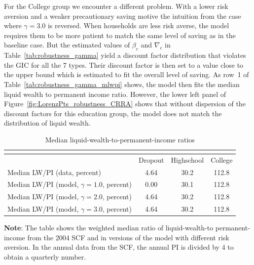 \documentclass[\econtexRoot/HAFiscal]{subfiles}
\begin{document}
For the College group we encounter a different problem. With a lower risk aversion and a weaker precautionary saving motive the intuition from the case where $\gamma=3.0$ is reversed. When households are less risk averse, the model requires them to be more patient to match the same level of saving as in the baseline case. But the estimated values of $\beta_c$ and $\nabla_c$ in Table~\ref{tab:robustness_gamma} yield a discount factor distribution that violates the GIC for all the 7 types. Their discount factor is then set to a value close to the upper bound which is estimated to fit the overall level of saving. As row~1 of Table~\ref{tab:robustness_gamma_mlwpi} shows, the model then fits the median liquid wealth to permanent income ratio. However, the lower left panel of Figure~\ref{fig:LorenzPts_robustness_CRRA} shows that without dispersion of the discount factors for this education group, the model does not match the distribution of liquid wealth.

 
\begin{table}[th]
  \begin{center}
    \begin{tabular}{lccc}
      \multicolumn{4}{l}{} \\ \midrule
      & Dropout & Highschool & College \\ \midrule
      Median LW/PI (data, percent) & 4.64 & 30.2 & 112.8 \\ 
      Median LW/PI (model, $\gamma = 1.0$, percent) & 0.00 & 30.1 & 112.8 \\	
      Median LW/PI (model, $\gamma = 2.0$, percent) & 4.64 & 30.2 & 112.8 \\
      Median LW/PI (model, $\gamma = 3.0$, percent) & 4.64 & 30.2 & 112.8 \\ \bottomrule
    \end{tabular}
    \caption{Median liquid-wealth-to-permanent-income ratios}
    \notinsubfile{\label{tab:robustness_gamma_mlwpi}}	
    \parbox{15cm}{\small \vspace{.05cm} \textbf{Note}: The table shows the weighted median ratio of liquid-wealth-to permanent-income from the 2004 SCF and in versions of the model with different risk aversion. In the annual data from the SCF, the annual PI is divided by 4 to obtain a quarterly number.\normalsize}
  \end{center}
\end{table}
\end{document}
